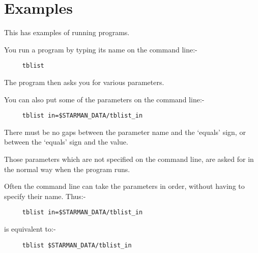 \section{Examples} 

  This has examples of running programs.

\vspace*{2mm}

 You run a program by typing its name on the command line:-

\begin{verbatim}
     tblist \end{verbatim}

 The program then asks you for various parameters.

\vspace*{2mm}

 You can also put some of the parameters on the command line:-

\begin{verbatim}
     tblist in=$STARMAN_DATA/tblist_in \end{verbatim}

 There must be no gaps between the parameter name and the `equals'
 sign, or between the `equals' sign and the value.

 Those parameters which are not specified on the command line, are
 asked for in the normal way when the program runs.

\vspace*{2mm}

 Often the command line can take the parameters in order, without
 having to specify their name. Thus:-

\begin{verbatim}
     tblist in=$STARMAN_DATA/tblist_in \end{verbatim}

 is equivalent to:-

\begin{verbatim}
     tblist $STARMAN_DATA/tblist_in \end{verbatim}

\vspace*{2mm}

